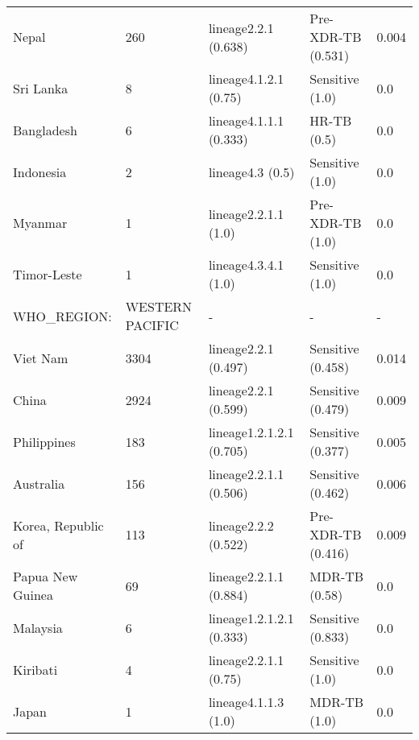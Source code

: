 \begin{tabular}{lllll}
 Nepal                                        & 260                   & lineage2.2.1 (0.638)     & Pre-XDR-TB (0.531)  & 0.004      \\
 Sri Lanka                                    & 8                     & lineage4.1.2.1 (0.75)    & Sensitive (1.0)     & 0.0        \\
 Bangladesh                                   & 6                     & lineage4.1.1.1 (0.333)   & HR-TB (0.5)         & 0.0        \\
 Indonesia                                    & 2                     & lineage4.3 (0.5)         & Sensitive (1.0)     & 0.0        \\
 Myanmar                                      & 1                     & lineage2.2.1.1 (1.0)     & Pre-XDR-TB (1.0)    & 0.0        \\
 Timor-Leste                                  & 1                     & lineage4.3.4.1 (1.0)     & Sensitive (1.0)     & 0.0        \\
 WHO\_REGION:                                  & WESTERN PACIFIC       & -                        & -                   & -          \\
 Viet Nam                                     & 3304                  & lineage2.2.1 (0.497)     & Sensitive (0.458)   & 0.014      \\
 China                                        & 2924                  & lineage2.2.1 (0.599)     & Sensitive (0.479)   & 0.009      \\
 Philippines                                  & 183                   & lineage1.2.1.2.1 (0.705) & Sensitive (0.377)   & 0.005      \\
 Australia                                    & 156                   & lineage2.2.1.1 (0.506)   & Sensitive (0.462)   & 0.006      \\
 Korea, Republic of                           & 113                   & lineage2.2.2 (0.522)     & Pre-XDR-TB (0.416)  & 0.009      \\
 Papua New Guinea                             & 69                    & lineage2.2.1.1 (0.884)   & MDR-TB (0.58)       & 0.0        \\
 Malaysia                                     & 6                     & lineage1.2.1.2.1 (0.333) & Sensitive (0.833)   & 0.0        \\
 Kiribati                                     & 4                     & lineage2.2.1.1 (0.75)    & Sensitive (1.0)     & 0.0        \\
 Japan                                        & 1                     & lineage4.1.1.3 (1.0)     & MDR-TB (1.0)        & 0.0        \\
\hline
\end{tabular}